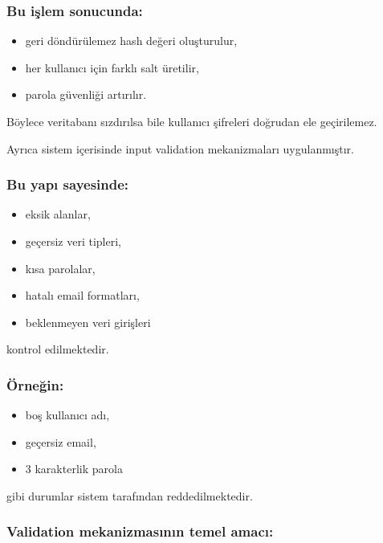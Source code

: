 \subsubsection{Bu işlem sonucunda:}

\begin{itemize}[leftmargin=*]
    \item geri döndürülemez hash değeri oluşturulur,
    \item her kullanıcı için farklı salt üretilir,
    \item parola güvenliği artırılır.
\end{itemize}

Böylece veritabanı sızdırılsa bile kullanıcı şifreleri doğrudan ele geçirilemez.

Ayrıca sistem içerisinde input validation mekanizmaları uygulanmıştır.

\subsubsection{Bu yapı sayesinde:}

\begin{itemize}[leftmargin=*]
    \item eksik alanlar,
    \item geçersiz veri tipleri,
    \item kısa parolalar,
    \item hatalı email formatları,
    \item beklenmeyen veri girişleri
\end{itemize}

kontrol edilmektedir.

\subsubsection{Örneğin:}

\begin{itemize}[leftmargin=*]
    \item boş kullanıcı adı,
    \item geçersiz email,
    \item 3 karakterlik parola
\end{itemize}

gibi durumlar sistem tarafından reddedilmektedir.

\subsubsection{Validation mekanizmasının temel amacı:}

